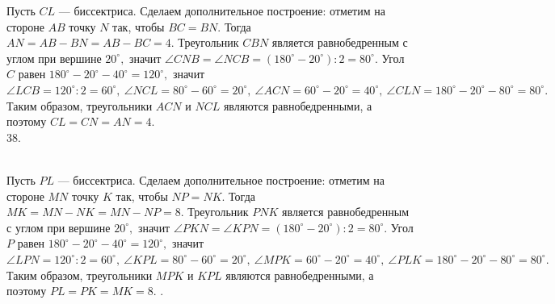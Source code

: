 \documentclass[12pt]{article}
\begin{document}
Пусть $CL$ --- биссектриса. Сделаем дополнительное построение: отметим на стороне $AB$ точку $N$ так, чтобы $BC=BN.$ Тогда $AN=AB-BN=AB-BC=4.$ Треугольник $CBN$ является равнобедренным с углом при вершине $20^\circ,$ значит $\angle CNB=\angle NCB=(180^\circ-20^\circ):2=80^\circ.$ Угол $C$ равен $180^\circ-20^\circ-40^\circ=120^\circ,$ значит $\angle LCB=120^\circ:2=60^\circ,\ \angle NCL=80^\circ-60^\circ=20^\circ,\ \angle ACN=60^\circ-20^\circ=40^\circ,\ \angle CLN=180^\circ-20^\circ-80^\circ=80^\circ.$ Таким образом, треугольники $ACN$ и $NCL$ являются равнобедренными, а поэтому $CL=CN=AN=4.$\\
38. \begin{figure}[ht!]
\end{figure}\\
Пусть $PL$ --- биссектриса. Сделаем дополнительное построение: отметим на стороне $MN$ точку $K$ так, чтобы $NP=NK.$ Тогда $MK=MN-NK=MN-NP=8.$ Треугольник $PNK$ является равнобедренным с углом при вершине $20^\circ,$ значит $\angle PKN=\angle KPN=(180^\circ-20^\circ):2=80^\circ.$ Угол $P$ равен $180^\circ-20^\circ-40^\circ=120^\circ,$ значит $\angle LPN=120^\circ:2=60^\circ,\ \angle KPL=80^\circ-60^\circ=20^\circ,\ \angle MPK=60^\circ-20^\circ=40^\circ,\ \angle PLK=180^\circ-20^\circ-80^\circ=80^\circ.$ Таким образом, треугольники $MPK$ и $KPL$ являются равнобедренными, а поэтому $PL=PK=MK=8.$\newpage
{}. \begin{figure}[ht!]
\end{figure}\\
\end{document}
